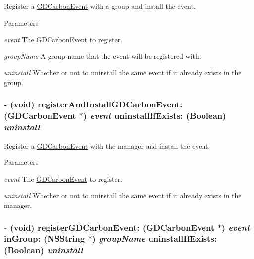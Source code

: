 Register a \hyperlink{interface_g_d_carbon_event}{GDCarbonEvent} with a group and install the event. 
\begin{DoxyParams}{Parameters}
\item[{\em event}]The \hyperlink{interface_g_d_carbon_event}{GDCarbonEvent} to register. \item[{\em groupName}]A group name that the event will be registered with. \item[{\em uninstall}]Whether or not to uninstall the same event if it already exists in the group. \end{DoxyParams}
\hypertarget{interface_g_d_carbon_event_manager_ab5c5be29227c0ac1ff709cf46bb44246}{
\subsubsection[{registerAndInstallGDCarbonEvent:uninstallIfExists:}]{\setlength{\rightskip}{0pt plus 5cm}-\/ (void) registerAndInstallGDCarbonEvent: ({\bf GDCarbonEvent} $\ast$) {\em event}\/ uninstallIfExists: (Boolean) {\em uninstall}}}
\label{interface_g_d_carbon_event_manager_ab5c5be29227c0ac1ff709cf46bb44246}


Register a \hyperlink{interface_g_d_carbon_event}{GDCarbonEvent} with the manager and install the event. 
\begin{DoxyParams}{Parameters}
\item[{\em event}]The \hyperlink{interface_g_d_carbon_event}{GDCarbonEvent} to register. \item[{\em uninstall}]Whether or not to uninstall the same event if it already exists in the manager. \end{DoxyParams}
\hypertarget{interface_g_d_carbon_event_manager_ac96cda5cbfaed699354a96a76b2e0fcd}{
\subsubsection[{registerGDCarbonEvent:inGroup:uninstallIfExists:}]{\setlength{\rightskip}{0pt plus 5cm}-\/ (void) registerGDCarbonEvent: ({\bf GDCarbonEvent} $\ast$) {\em event}\/ inGroup: ({\bf NSString} $\ast$) {\em groupName}\/ uninstallIfExists: (Boolean) {\em uninstall}}}
\label{interface_g_d_carbon_event_manager_ac96cda5cbfaed699354a96a76b2e0fcd}


